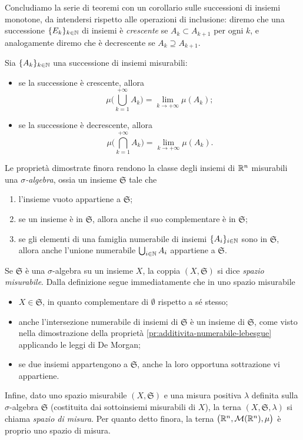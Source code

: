 Concludiamo la serie di teoremi con un corollario sulle successioni di insiemi monotone, da intendersi rispetto alle operazioni di inclusione: diremo che una successione $\{E_k\}_{k\in\mathbb{N}}$ di insiemi è \emph{crescente} se $A_k\subset A_{k+1}$ per ogni $k$, e analogamente diremo che è decrescente se $A_k\supseteq A_{k+1}$.
\begin{corollario} \label{cor:misura-successioni-insiemi}
	Sia $\{A_k\}_{k\in\mathbb{N}}$ una successione di insiemi misurabili:
	\begin{itemize}
		\item se la successione è crescente, allora
			\begin{equation}
				\mu\bigg(\bigcup_{k=1}^{+\infty}A_k\bigg)=\lim_{k\to+\infty}\mu(A_k);
			\end{equation}
		\item se la successione è decrescente, allora
			\begin{equation}
				\mu\bigg(\bigcap_{k=1}^{+\infty}A_k\bigg)=\lim_{k\to+\infty}\mu(A_k).
			\end{equation}
	\end{itemize}
\end{corollario}

Le proprietà dimostrate finora rendono la classe degli insiemi di $\mathbb{R}^n$ misurabili una \emph{$\sigma$-algebra}, ossia un insieme $\mathfrak S$ tale che
\begin{enumerate}
	\item l'insieme vuoto appartiene a $\mathfrak S$;
	\item se un insieme è in $\mathfrak S$, allora anche il suo complementare è in $\mathfrak S$;
	\item se gli elementi di una famiglia numerabile di insiemi $\{A_i\}_{i\in\mathbb{N}}$ sono in $\mathfrak S$, allora anche l'unione numerabile $\bigcup_{i\in\mathbb{N}}A_i$ appartiene a $\mathfrak S$.
\end{enumerate}
Se $\mathfrak S$ è una $\sigma$-algebra su un insieme $X$, la coppia $(X,\mathfrak S)$ si dice \emph{spazio misurabile}.
Dalla definizione segue immediatamente che in uno spazio misurabile
\begin{itemize}
	\item $X\in\mathfrak S$, in quanto complementare di $\emptyset$ rispetto a s\'e stesso;
	\item anche l'intersezione numerabile di insiemi di $\mathfrak S$ è un insieme di $\mathfrak S$, come visto nella dimostrazione della proprietà \ref{pr:additivita-numerabile-lebesgue} applicando le leggi di De Morgan;
	\item se due insiemi appartengono a $\mathfrak S$, anche la loro opportuna sottrazione vi appartiene.
\end{itemize}
Infine, dato uno spazio misurabile $(X,\mathfrak S)$ e una misura positiva $\lambda$ definita sulla $\sigma$-algebra $\mathfrak S$ (costituita dai sottoinsiemi misurabili di $X$), la terna $(X,\mathfrak S,\lambda)$ si chiama \emph{spazio di misura}.
Per quanto detto finora, la terna $\big(\mathbb{R}^n,\mathcal M(\mathbb{R}^n),\mu\big)$ è proprio uno spazio di misura.

